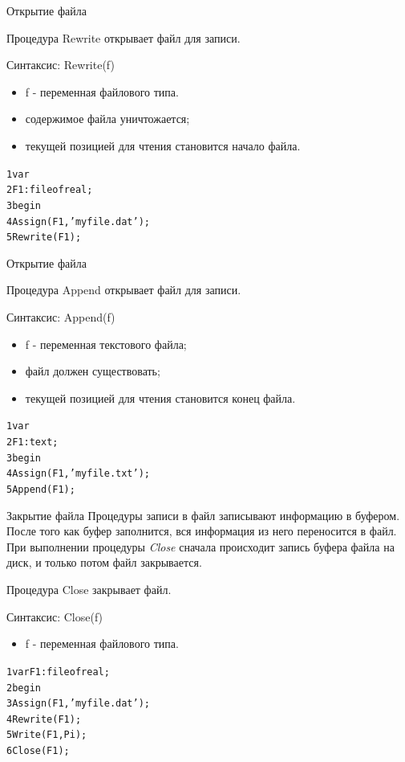 \documentclass{beamer}
\begin{document}
\begin{frame}[fragile]{Открытие файла}
\begin{block}{Процедура Rewrite}
открывает файл для записи.
\end{block}
Синтаксис: Rewrite(f)
\begin{itemize}
\item f - переменная файлового типа.
\item содержимое файла уничтожается;
\item текущей позицией для чтения становится начало файла.
\end{itemize}
\begin{alltt}
 1 var                  
 2   F1: file of real;
 3 begin
 4   Assign(F1, 'myfile.dat');
 5   Rewrite(F1);
\end{alltt}
\end{frame} 

\begin{frame}[fragile]{Открытие файла}
\begin{block}{Процедура Append}
открывает файл для записи.
\end{block}
Синтаксис: Append(f)
\begin{itemize}
\item f - переменная текстового файла;
\item файл должен существовать;
\item текущей позицией для чтения становится конец файла.
\end{itemize}
\begin{alltt}
 1 var                  
 2   F1: text;
 3 begin
 4   Assign(F1, 'myfile.txt');
 5   Append(F1);
\end{alltt}
\end{frame} 

\begin{frame}[fragile]{Закрытие файла}
Процедуры записи в файл записывают информацию в буфером. После того как буфер заполнится, вся информация из него переносится в файл. При выполнении процедуры \textit{Close} сначала происходит запись буфера файла на диск, и только потом файл закрывается.
\begin{block}{Процедура Close}
закрывает файл.
\end{block}
Синтаксис: Close(f)
\begin{itemize}
\item f - переменная файлового типа.
\end{itemize}
\begin{alltt}
 1 var F1: file of real;
 2 begin
 3   Assign(F1, 'myfile.dat');
 4   Rewrite(F1);
 5   Write(F1, Pi);
 6   Close(F1);
\end{alltt}
\end{frame} 
\end{document}
